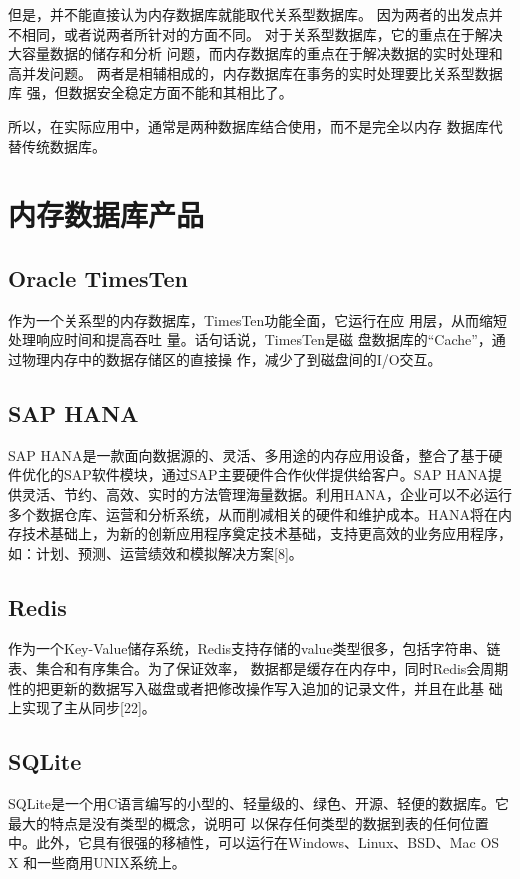 \documentclass{zjutthesis}
\begin{document}
但是，并不能直接认为内存数据库就能取代关系型数据库。
因为两者的出发点并不相同，或者说两者所针对的方面不同。
对于关系型数据库，它的重点在于解决大容量数据的储存和分析
问题，而内存数据库的重点在于解决数据的实时处理和高并发问题。
两者是相辅相成的，内存数据库在事务的实时处理要比关系型数据库
强，但数据安全稳定方面不能和其相比了。

所以，在实际应用中，通常是两种数据库结合使用，而不是完全以内存
数据库代替传统数据库。

\section{内存数据库产品}
\subsection{Oracle TimesTen}
作为一个关系型的内存数据库，TimesTen功能全面，它运行在应
用层，从而缩短处理响应时间和提高吞吐
量。话句话说，TimesTen是磁
盘数据库的“Cache”，通过物理内存中的数据存储区的直接操
作，减少了到磁盘间的I/O交互。

\subsection{SAP HANA}
SAP HANA是一款面向数据源的、灵活、多用途的内存应用设备，整合了基于硬件优化的SAP软件模块，通过SAP主要硬件合作伙伴提供给客户。SAP HANA提供灵活、节约、高效、实时的方法管理海量数据。利用HANA，企业可以不必运行多个数据仓库、运营和分析系统，从而削减相关的硬件和维护成本。HANA将在内存技术基础上，为新的创新应用程序奠定技术基础，支持更高效的业务应用程序，如：计划、预测、运营绩效和模拟解决方案[8]。

\subsection{Redis}
作为一个Key-Value储存系统，Redis支持存储的value类型很多，包括字符串、链表、集合和有序集合。为了保证效率，
数据都是缓存在内存中，同时Redis会周期性的把更新的数据写入磁盘或者把修改操作写入追加的记录文件，并且在此基
础上实现了主从同步[22]。

\subsection{SQLite}
SQLite是一个用C语言编写的小型的、轻量级的、绿色、开源、轻便的数据库。它最大的特点是没有类型的概念，说明可
以保存任何类型的数据到表的任何位置中。此外，它具有很强的移植性，可以运行在Windows、Linux、BSD、Mac OS X
和一些商用UNIX系统上。
\end{document}
